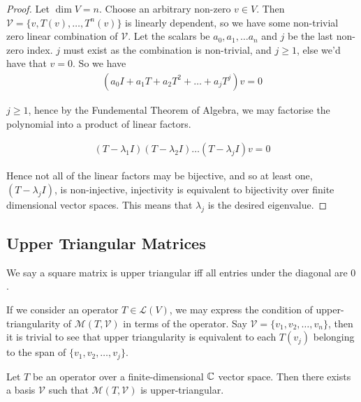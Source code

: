 \documentclass[]{article}
\begin{document}
\begin{proof}
		Let $\dim V = n$. Choose an arbitrary non-zero $v \in V$. Then $\mathcal{V} = \{v, T(v), \ldots, T^{n}(v)\}$ is linearly dependent, so we have some non-trivial zero linear combination of $\mathcal{V}$. Let the scalars be $a_0, a_1, \ldots a_n$ and $j$ be the last non-zero index. $j$ must exist as the combination is non-trivial, and $j \geq 1$, else we'd have that $v = 0$. So we have
		\begin{align*}
				(a_0 I + a_1 T + a_2 T^2 + \ldots + a_j T^j) v = 0
		\end{align*}

		$j \geq 1$, hence by the Fundemental Theorem of Algebra, we may factorise the polynomial into a product of linear factors.

		\begin{align*}
				(T - \lambda_1 I) (T - \lambda_2 I) \ldots (T - \lambda_j I) v = 0
		\end{align*}

		Hence not all of the linear factors may be bijective, and so at least one, $(T - \lambda_j I)$, is non-injective, injectivity is equivalent to bijectivity over finite dimensional vector spaces. This means that $\lambda_j$ is the desired eigenvalue.
\end{proof}

\subsection{Upper Triangular Matrices}

\begin{defi} 
		We say a square matrix is upper triangular iff all entries under the diagonal are $0$.
\end{defi}

If we consider an operator $T \in \mathcal{L}(V)$, we may express the condition of upper-triangularity of $\mathcal{M}(T, \mathcal{V})$ in terms of the operator. Say $\mathcal{V} = \{v_1, v_2, \ldots, v_n\}$, then it is trivial to see that upper triangularity is equivalent to each $T(v_j)$ belonging to the span of $\{v_1, v_2, \ldots, v_j\}$.

\begin{thm}
		Let $T$ be an operator over a finite-dimensional $\mathbb{C}$ vector space. Then there exists a basis $\mathcal{V}$ such that $\mathcal{M}(T, \mathcal{V})$ is upper-triangular.
\end{thm}
\end{document}
